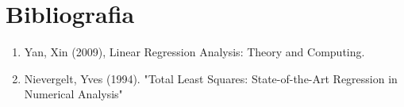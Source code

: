 \section{Bibliografia}

\begin{enumerate}
    \item Yan, Xin (2009), Linear Regression Analysis: Theory and Computing.
    \item Nievergelt, Yves (1994). "Total Least Squares: State-of-the-Art Regression in Numerical Analysis"
\end{enumerate}
